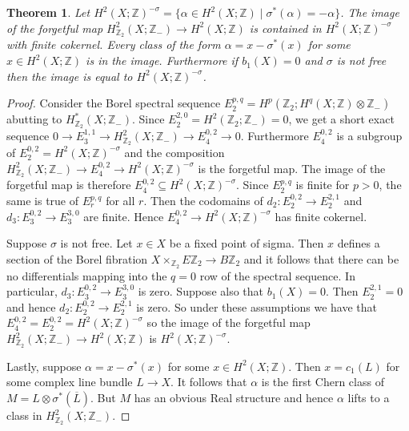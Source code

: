 \documentclass{amsart}
\newtheorem{theorem}{Theorem}[section]
\theoremstyle{definition}
\theoremstyle{remark}
\numberwithin{equation}{section}
\begin{document}
\begin{theorem}\label{thm:eqh2}
Let $H^2(X ; \mathbb{Z})^{-\sigma} = \{ \alpha \in H^2(X ; \mathbb{Z}) \; | \; \sigma^*(\alpha) = -\alpha\}$. The image of the forgetful map $H^2_{\mathbb{Z}_2}(X ; \mathbb{Z}_-) \to H^2(X ; \mathbb{Z})$ is contained in $H^2(X ; \mathbb{Z})^{-\sigma}$ with finite cokernel. Every class of the form $\alpha = x - \sigma^*(x)$ for some $x \in H^2(X ; \mathbb{Z})$ is in the image. Furthermore if $b_1(X) = 0$ and $\sigma$ is not free then the image is equal to $H^2(X ; \mathbb{Z})^{-\sigma}$.
\end{theorem}
\begin{proof}
Consider the Borel spectral sequence $E_2^{p,q} = H^p( \mathbb{Z}_2 ; H^q(X ; \mathbb{Z}) \otimes \mathbb{Z}_-)$ abutting to $H^*_{\mathbb{Z}_2}(X ; \mathbb{Z}_-)$. Since $E_2^{2,0} = H^2( \mathbb{Z}_2 ; \mathbb{Z}_-) = 0$, we get a short exact sequence $0 \to E_3^{1,1} \to H^2_{\mathbb{Z}_2}(X ; \mathbb{Z}_-) \to E_4^{0,2} \to 0$. Furthermore $E_4^{0,2}$ is a subgroup of $E_2^{0,2} = H^2(X ; \mathbb{Z})^{-\sigma}$ and the composition $H^2_{\mathbb{Z}_2}(X ; \mathbb{Z}_-) \to E_4^{0,2} \to H^2(X ; \mathbb{Z})^{-\sigma}$ is the forgetful map. The image of the forgetful map is therefore $E_4^{0,2} \subseteq H^2(X ; \mathbb{Z})^{-\sigma}$. Since $E_2^{p,q}$ is finite for $p>0$, the same is true of $E_r^{p,q}$ for all $r$. Then the codomains of $d_2 : E_2^{0,2} \to E_2^{2,1}$ and $d_3 : E_3^{0,2} \to E_3^{3,0}$ are finite. Hence $E_4^{0,2} \to H^2(X ; \mathbb{Z})^{-\sigma}$ has finite cokernel.

Suppose $\sigma$ is not free. Let $x \in X$ be a fixed point of sigma. Then $x$ defines a section of the Borel fibration $X \times_{\mathbb{Z}_2} E\mathbb{Z}_2 \to B\mathbb{Z}_2$ and it follows that there can be no differentials mapping into the $q=0$ row of the spectral sequence. In particular, $d_3 : E_3^{0,2} \to E_3^{3,0}$ is zero. Suppose also that $b_1(X) = 0$. Then $E_2^{2,1} = 0$ and hence $d_2 : E_2^{0,2} \to E_2^{2,1}$ is zero. So under these assumptions we have that $E_4^{0,2} = E_2^{0,2} = H^2(X ; \mathbb{Z})^{-\sigma}$ so the image of the forgetful map $H^2_{\mathbb{Z}_2}(X ; \mathbb{Z}_-) \to H^2(X ; \mathbb{Z})$ is $H^2(X ; \mathbb{Z})^{-\sigma}$.

Lastly, suppose $\alpha = x - \sigma^*(x)$ for some $x \in H^2(X ; \mathbb{Z})$. Then $x = c_1(L)$ for some complex line bundle $L \to X$. It follows that $\alpha$ is the first Chern class of $M = L \otimes \sigma^*( \overline{L})$. But $M$ has an obvious Real structure and hence $\alpha$ lifts to a class in $H^2_{\mathbb{Z}_2}(X ; \mathbb{Z}_-)$.
\end{proof}
\end{document}

